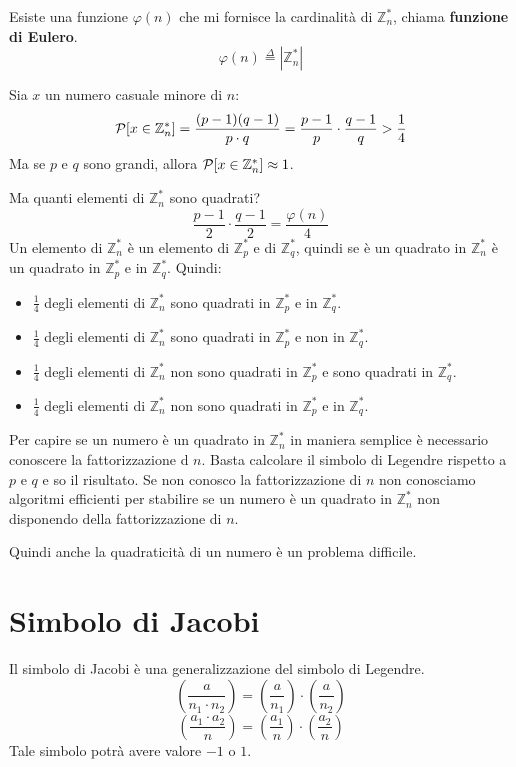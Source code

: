 Esiste una funzione $\varphi(n)$ che mi fornisce la cardinalità di 
$\mathbb{Z}_n^*$, chiama \textbf{funzione di Eulero}.
\[
  \varphi(n) \stackrel{\Delta}{=} |\mathbb{Z}_n^*|
\]

Sia $x$ un numero casuale minore di $n$:
\[
  \text{$\mathcal{P}$}[x \in \mathbb{Z}_n^*] = \frac{(p-1)(q-1)}{p\cdot q} =
  \frac{p-1}{p} \cdot \frac{q-1}{q} > \frac{1}{4}
\]
Ma se $p$ e $q$ sono grandi, allora $\text{$\mathcal{P}$}[x \in \mathbb{Z}_n^*] \approx 1$.

Ma quanti elementi di $\mathbb{Z}_n^*$ sono quadrati?
\[
  \frac{p - 1}{2} \cdot \frac{q - 1}{2} = \frac{\varphi(n)}{4}
\]
Un elemento di $\mathbb{Z}_n^*$ è un elemento di $\mathbb{Z}_p^*$ e 
di $\mathbb{Z}_q^*$, quindi se è un quadrato in $\mathbb{Z}_n^*$ è un
quadrato in $\mathbb{Z}_p^*$ e in $\mathbb{Z}_q^*$.
Quindi:
\begin{itemize}
  \item $\frac{1}{4}$ degli elementi di $\mathbb{Z}_n^*$ sono quadrati in 
  $\mathbb{Z}_p^*$ e in $\mathbb{Z}_q^*$.
  \item $\frac{1}{4}$ degli elementi di $\mathbb{Z}_n^*$ sono quadrati in 
  $\mathbb{Z}_p^*$ e non in $\mathbb{Z}_q^*$.
  \item $\frac{1}{4}$ degli elementi di $\mathbb{Z}_n^*$ non sono quadrati in
  $\mathbb{Z}_p^*$ e sono quadrati in $\mathbb{Z}_q^*$.
  \item $\frac{1}{4}$ degli elementi di $\mathbb{Z}_n^*$ non sono quadrati in
  $\mathbb{Z}_p^*$ e in $\mathbb{Z}_q^*$.
\end{itemize}
Per capire se un numero è un quadrato in $\mathbb{Z}_n^*$  in 
maniera semplice è necessario conoscere la fattorizzazione d $n$.
Basta calcolare il simbolo di Legendre rispetto a $p$ e $q$ e so il
risultato. Se non conosco la fattorizzazione di $n$ non conosciamo 
algoritmi efficienti per stabilire se un numero è un quadrato in
$\mathbb{Z}_n^*$ non disponendo della fattorizzazione di $n$.

Quindi anche la quadraticità di un numero è un problema difficile.

\section{Simbolo di Jacobi}
Il simbolo di Jacobi è una generalizzazione del simbolo di Legendre.
\[
    \left(\frac{a}{n_1 \cdot n_2}\right) = 
    \left(\frac{a}{n_1}\right) \cdot \left(\frac{a}{n_2}\right)
  \]
  \[
    \left(\frac{a_1 \cdot a_2}{n}\right) = 
    \left(\frac{a_1}{n}\right) \cdot \left(\frac{a_2}{n}\right)
  \]
  Tale simbolo potrà avere valore $-1$ o $1$.

